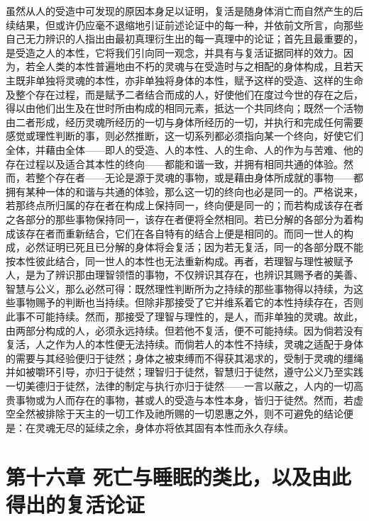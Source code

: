 虽然从人的受造中可发现的原因本身足以证明，复活是随身体消亡而自然产生的后续结果，但或许仍应毫不退缩地引证前述论证中的每一种，并依前文所言，向那些自己无力辨识的人指出由最初真理衍生出的每一真理中的论证；首先且最重要的，是受造之人的本性，它将我们引向同一观念，并具有与复活证据同样的效力。因为，若全人类的本性普遍地由不朽的灵魂与在受造时与之相配的身体构成，且若天主既非单独将灵魂的本性，亦非单独将身体的本性，赋予这样的受造、这样的生命及整个存在过程，而是赋予二者结合而成的人，好使他们在度过今世的存在之后，得以由他们出生及在世时所由构成的相同元素，抵达一个共同终向；既然一个活物由二者形成，经历灵魂所经历的一切与身体所经历的一切，并执行和完成任何需要感觉或理性判断的事，则必然推断，这一切系列都必须指向某一个终向，好使它们全体，并藉由全体——即人的受造、人的本性、人的生命、人的作为与苦难、他的存在过程以及适合其本性的终向——都能和谐一致，并拥有相同共通的体验。然而，若整个存在者——无论是源于灵魂的事物，或是藉由身体所成就的事物——都拥有某种一体的和谐与共通的体验，那么这一切的终向也必是同一的。严格说来，若那终点所归属的存在者在构成上保持同一，终向便是同一的；而若构成该存在者之各部分的那些事物保持同一，该存在者便将全然相同。若已分解的各部分为着构成该存在者而重新结合，它们在各自特有的结合上便是相同的。而同一世人的构成，必然证明已死且已分解的身体将会复活；因为若无复活，同一的各部分既不能按本性彼此结合，同一世人的本性也无法重新构成。再者，若理智与理性被赋予人，是为了辨识那由理智领悟的事物，不仅辨识其存在，也辨识其赐予者的美善、智慧与公义，那么必然可得：既然理性判断所为之持续的那些事物得以持续，为这些事物赐予的判断也当持续。但除非那接受了它并维系着它的本性持续存在，否则此事不可能持续。然而，那接受了理智与理性的，是人，而非单独的灵魂。故此，由两部分构成的人，必须永远持续。但若他不复活，便不可能持续。因为倘若没有复活，人之作为人的本性便无法持续。而倘若人的本性不持续，灵魂之适配于身体的需要与其经验便归于徒然；身体之被束缚而不得获其渴求的，受制于灵魂的缰绳并如被嚼环引导，亦归于徒然；理智归于徒然，智慧归于徒然，遵守公义乃至实践一切美德归于徒然，法律的制定与执行亦归于徒然——一言以蔽之，人内的一切高贵事物或为人而存在的事物，甚或人的受造与本性本身，皆归于徒然。然而，若虚空全然被排除于天主的一切工作及祂所赐的一切恩惠之外，则不可避免的结论便是：在灵魂无尽的延续之余，身体亦将依其固有本性而永久存续。\par


\section{第十六章 死亡与睡眠的类比，以及由此得出的复活论证}

